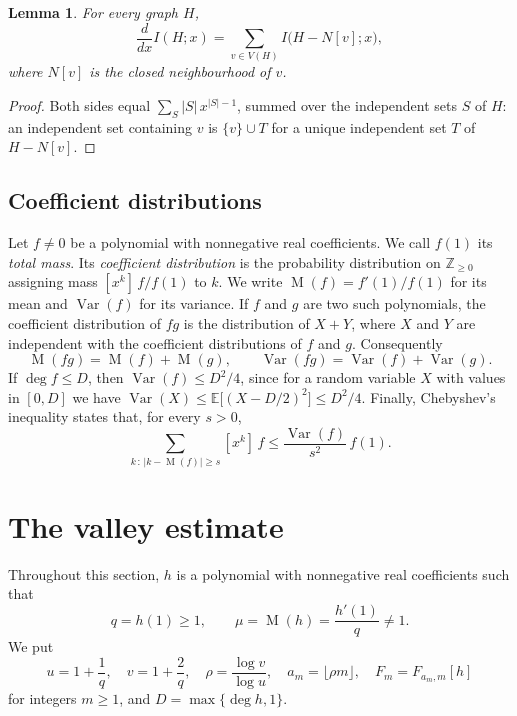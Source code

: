 \documentclass[11pt]{amsart}
\newtheorem{lemma}[theorem]{Lemma}
\theoremstyle{remark}
\numberwithin{equation}{section}
\newcommand{\coef}[2]{[x^{#1}]\,#2}
\DeclareMathOperator{\M}{M}
\DeclareMathOperator{\Var}{Var}
\begin{document}
\begin{lemma}\label{lem:derivative}
For every graph $H$,
\[
\frac{d}{dx}I(H;x)=\sum_{v\in V(H)} I\bigl(H-N[v];x\bigr),
\]
where $N[v]$ is the closed neighbourhood of $v$.
\end{lemma}

\begin{proof}
Both sides equal $\sum_S |S|\,x^{|S|-1}$, summed over the independent sets $S$ of $H$: an independent set containing $v$ is $\{v\}\cup T$ for a unique independent set $T$ of $H-N[v]$.
\end{proof}

\subsection*{Coefficient distributions}
Let $f\ne 0$ be a polynomial with nonnegative real coefficients. We call $f(1)$ its \emph{total mass}. Its \emph{coefficient distribution} is the probability distribution on $\mathbb{Z}_{\ge 0}$ assigning mass $\coef{k}{f}/f(1)$ to $k$. We write $\M(f)=f'(1)/f(1)$ for its mean and $\Var(f)$ for its variance. If $f$ and $g$ are two such polynomials, the coefficient distribution of $fg$ is the distribution of $X+Y$, where $X$ and $Y$ are independent with the coefficient distributions of $f$ and $g$. Consequently
\begin{equation}\label{eq:additive}
\M(fg)=\M(f)+\M(g),\qquad \Var(fg)=\Var(f)+\Var(g).
\end{equation}
If $\deg f\le D$, then $\Var(f)\le D^2/4$, since for a random variable $X$ with values in $[0,D]$ we have $\Var(X)\le\mathbb{E}\bigl[(X-D/2)^2\bigr]\le D^2/4$. Finally, Chebyshev's inequality states that, for every $s>0$,
\begin{equation}\label{eq:chebyshev}
\sum_{k\,:\,|k-\M(f)|\ge s}\coef{k}{f}\le\frac{\Var(f)}{s^2}\,f(1).
\end{equation}

\section{The valley estimate}\label{sec:valley}

Throughout this section, $h$ is a polynomial with nonnegative real coefficients such that
\[
q=h(1)\ge 1,\qquad \mu=\M(h)=\frac{h'(1)}{q}\ne 1 .
\]
We put
\[
u=1+\frac1q,\quad v=1+\frac2q,\quad \rho=\frac{\log v}{\log u},\quad a_m=\lfloor\rho m\rfloor,\quad F_m=F_{a_m,m}[h]
\]
for integers $m\ge 1$, and $D=\max\{\deg h,1\}$.
\end{document}

